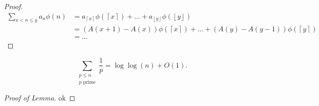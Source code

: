 \documentclass[12pt]{amsart}
\begin{document}
\begin{proof}
\begin{align*}
    \sum _{x < n \leq y} a_{n} \phi(n) & = a_{\left\lceil x \right\rceil } \phi(\left\lceil x \right\rceil ) + \dots  + a_{\left\lfloor y \right\rfloor } \phi(\left\lfloor y \right\rfloor )\\
    & = \left( A(x + 1) - A(x) \right) \phi(\left\lceil x \right\rceil ) + \dots + \left( A(y) - A(y-1) \right) \phi(\left\lceil y \right\rceil ) \\
    & = \dots 
\end{align*}
\end{proof}






\begin{lemma*}
\[
    \sum _{\substack{ p \leq n \\ p\text{ prime}  }} \frac{1}{p}  = \log\log \left( n \right) + O(1)
.\]
\end{lemma*}

\begin{proof}[Proof of Lemma]
ok
\end{proof}
\end{document}
